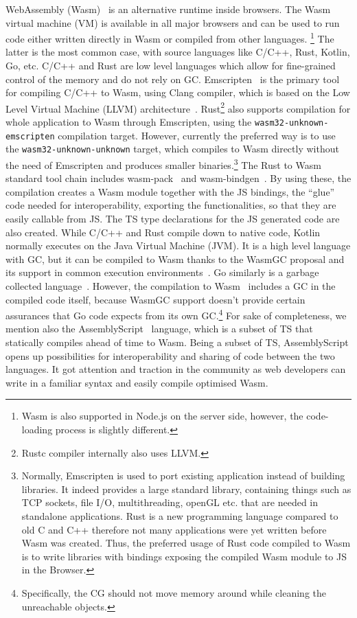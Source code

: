 WebAssembly (Wasm)~\cite{Haas2017,WasmSpecification} is an alternative runtime
inside browsers.
The Wasm virtual machine (VM) is available in all major
browsers and can be used to run code either written directly in Wasm
or compiled from other languages.
\footnote{Wasm is also supported in Node.js on the server side, however, the
code-loading process is slightly different.} 
The latter is the
most common case, with source languages like C/C++, Rust,
Kotlin, Go, etc. C/C++ and Rust are low level languages
which allow for fine-grained control of the memory
and do not rely on GC. Emscripten~\cite{Zakai2011} is the primary 
tool for compiling C/C++ to Wasm, using Clang compiler,
which is based on the Low Level Virtual Machine
(LLVM) architecture~\cite{LLVM2004}.
Rust\footnote{Rustc compiler internally also uses LLVM.} also supports compilation for whole application to Wasm
through Emscripten, using the \texttt{wasm32-unknown-emscripten}
compilation target.
However, currently the preferred way is to use
the \texttt{wasm32-unknown-unknown} target, which
compiles to Wasm directly without the need of Emscripten
and produces smaller binaries.\footnote{Normally,
Emscripten is used to port existing application instead 
of building libraries. It indeed 
provides a large standard library, 
containing things such as TCP sockets, 
file I/O, multithreading, openGL etc. that are needed in
standalone applications.
Rust is a new programming language compared to
old C and C++ therefore not many applications were yet 
written before Wasm was created. 
Thus, the preferred usage of Rust code compiled to Wasm
is to write libraries with bindings exposing the
compiled Wasm module to JS in the Browser.}
The Rust to Wasm standard tool chain includes 
wasm-pack~\cite{WasmPack} and wasm-bindgen~\cite{WasmBindgen}.
By using these, the compilation creates a Wasm 
module together with the JS bindings, the ``glue'' code
needed for interoperability, exporting the functionalities, 
so that they are easily callable from JS. The TS type declarations 
for the JS generated code are also created.
While C/C++ and Rust compile down to native code, Kotlin normally executes on the
Java Virtual Machine (JVM). It is a high level language with GC,
but it can be compiled to Wasm thanks to the WasmGC proposal
and its support in common execution environments~\cite{WasmGCProposal, WasmGCinV8}.
Go similarly is a garbage collected language~\cite{GoGarbageCollector}.
However, the compilation to Wasm~\cite{GOWasm} 
includes a GC in the compiled code itself, because WasmGC support doesn't
provide certain assurances that Go code expects from its own GC.\footnote{Specifically, the CG should not move memory around while cleaning the unreachable objects.}
For sake of completeness, we mention also the AssemblyScript~\cite{AssemblyScript} language, 
which is a subset of TS that statically compiles ahead of time to Wasm.
Being a subset of TS, AssemblyScript opens up possibilities for
interoperability and sharing of code between the two languages.
It got attention and traction in the community as web developers 
can write in a familiar syntax and easily compile optimised Wasm.

